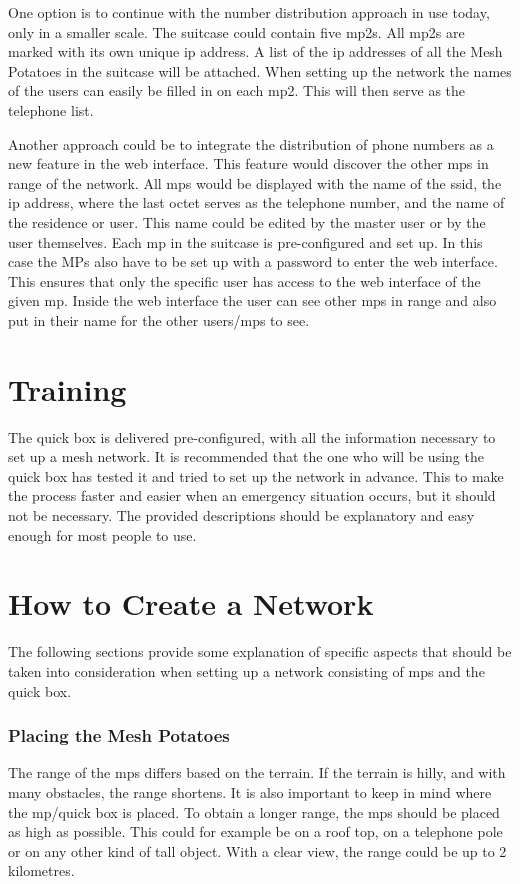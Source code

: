One option is to continue with the number distribution approach in use today, only in a smaller scale. The suitcase could contain five \glspl{mp2}. All \glspl{mp2} are marked with its own unique \gls{ip} address. A list of the \gls{ip} addresses of all the Mesh Potatoes in the suitcase will be attached. When setting up the network the names of the users can easily be filled in on each \gls{mp2}. This will then serve as the telephone list. 

Another approach could be to integrate the distribution of phone numbers as a new feature in the web interface. This feature would discover the other \glspl{mp} in range of the network. All \glspl{mp} would be displayed with the name of the \gls{ssid}, the \gls{ip} address, where the last octet serves as the telephone number, and the name of the residence or user. This name could be edited by the master user or by the user themselves. Each \gls{mp} in the suitcase is pre-configured and set up. In this case the MPs also have to be set up with a password to enter the web interface. This ensures that only the specific user has access to the web interface of the given \gls{mp}. Inside the web interface the user can see other \glspl{mp} in range and also put in their name for the other users/\glspl{mp} to see. 

\section{Training}
The \gls{quick} box is delivered pre-configured, with all the  information necessary to set up a mesh network. It is recommended that the one who will be using the \gls{quick} box has tested it and tried to set up the network in advance. This to make the process faster and easier when an emergency situation occurs, but it should not be necessary. The provided descriptions should be explanatory and easy enough for most people to use.


\section{How to Create a Network}
The following sections provide some explanation of specific aspects that should be taken into consideration when setting up a network consisting of \glspl{mp} and the \gls{quick} box. 

\subsubsection{Placing the Mesh Potatoes}
The range of the \glspl{mp} differs based on the terrain. If the terrain is hilly, and with many obstacles, the range shortens. It is also important to keep in mind where the \gls{mp}/\gls{quick} box is placed. To obtain a longer range, the \glspl{mp} should be placed as high as possible. This could for example be on a roof top, on a telephone pole or on any other kind of tall object. With a clear view, the range could be up to 2 kilometres. 

